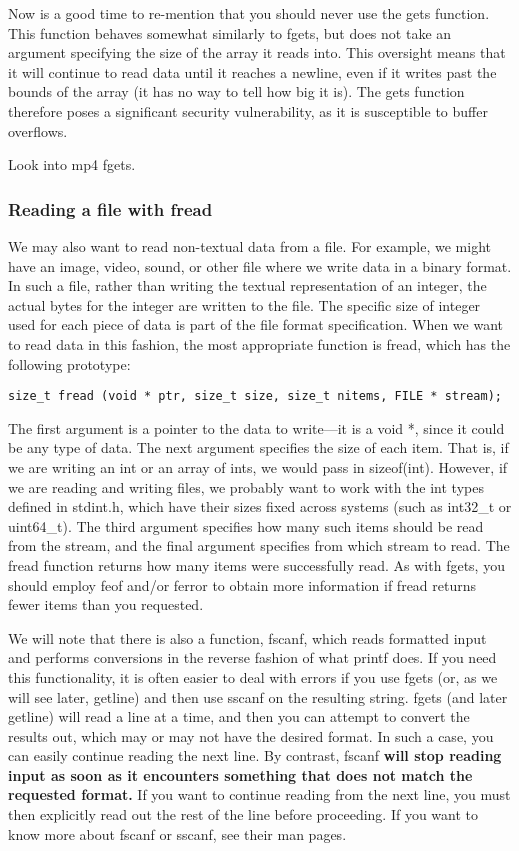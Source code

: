 \documentclass[11pt, a4paper]{article}
\begin{document}
Now is a good time to re-mention that you should never use the gets function. This function behaves somewhat similarly to fgets, but does not take an argument specifying the size of the array it reads into. This oversight means that it will continue to read data until it reaches a newline, even if it writes past the bounds of the array (it has no way to tell how big it is). The gets function therefore poses a significant security vulnerability, as it is susceptible to buffer overflows.



Look into mp4 fgets.




\subsubsection{Reading a file with fread}%
\label{ssub:reading_a_file_with_fread}

We may also want to read non-textual data from a file. For example, we might have an image, video, sound, or other file where we write data in a binary format. In such a file, rather than writing the textual representation of an integer, the actual bytes for the integer are written to the file. The specific size of integer used for each piece of data is part of the file format specification. When we want to read data in this fashion, the most appropriate function is fread, which has the following prototype:

\texttt{size\_t fread (void * ptr, size\_t size, size\_t nitems, FILE * stream);} 


The first argument is a pointer to the data to write—it is a void *, since it could be any type of data. The next argument specifies the size of each item. That is, if we are writing an int or an array of ints, we would pass in sizeof(int). However, if we are reading and writing files, we probably want to work with the int types defined in stdint.h, which have their sizes fixed across systems (such as int32\_t or uint64\_t). The third argument specifies how many such items should be read from the stream, and the final argument specifies from which stream to read. The fread function returns how many items were successfully read. As with fgets, you should employ feof and/or ferror to obtain more information if fread returns fewer items than you requested.


We will note that there is also a function, fscanf, which reads formatted input and performs conversions in the reverse fashion of what printf does. If you need this functionality, it is often easier to deal with errors if you use fgets (or, as we will see later, getline) and then use sscanf on the resulting string. fgets (and later getline) will read a line at a time, and then you can attempt to convert the results out, which may or may not have the desired format. In such a case, you can easily continue reading the next line. By contrast, fscanf \textbf{will stop reading input as soon as it encounters something that does not match the requested format.} If you want to continue reading from the next line, you must then explicitly read out the rest of the line before proceeding. If you want to know more about fscanf or sscanf, see their man pages.
\end{document}
